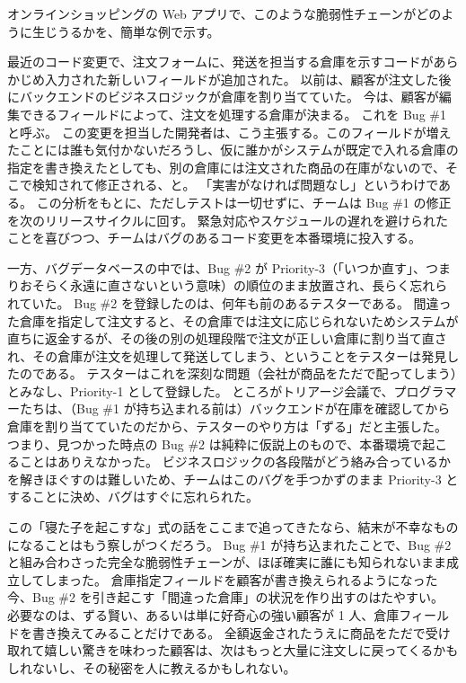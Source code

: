 \documentclass[uplatex]{jsarticle}
\def\label#1{}%
\begin{document}
\begin{exa}[オンラインショッピングにおける脆弱性チェーン]\label{exa:ch8-warehouse-chain}
オンラインショッピングの Web アプリで、このような脆弱性チェーンがどのように生じうるかを、簡単な例で示す。

最近のコード変更で、注文フォームに、発送を担当する倉庫を示すコードがあらかじめ入力された新しいフィールドが追加された。
以前は、顧客が注文した後にバックエンドのビジネスロジックが倉庫を割り当てていた。
今は、顧客が編集できるフィールドによって、注文を処理する倉庫が決まる。
これを Bug \#1 と呼ぶ。
この変更を担当した開発者は、こう主張する。このフィールドが増えたことには誰も気付かないだろうし、仮に誰かがシステムが既定で入れる倉庫の指定を書き換えたとしても、別の倉庫には注文された商品の在庫がないので、そこで検知されて修正される、と。
「実害がなければ問題なし」というわけである。
この分析をもとに、ただしテストは一切せずに、チームは Bug \#1 の修正を次のリリースサイクルに回す。
緊急対応やスケジュールの遅れを避けられたことを喜びつつ、チームはバグのあるコード変更を本番環境に投入する。

一方、バグデータベースの中では、Bug \#2 が Priority-3（「いつか直す」、つまりおそらく永遠に直さないという意味）の順位のまま放置され、長らく忘れられていた。
Bug \#2 を登録したのは、何年も前のあるテスターである。
間違った倉庫を指定して注文すると、その倉庫では注文に応じられないためシステムが直ちに返金するが、その後の別の処理段階で注文が正しい倉庫に割り当て直され、その倉庫が注文を処理して発送してしまう、ということをテスターは発見したのである。
テスターはこれを深刻な問題（会社が商品をただで配ってしまう）とみなし、Priority-1 として登録した。
ところがトリアージ会議で、プログラマーたちは、（Bug \#1 が持ち込まれる前は）バックエンドが在庫を確認してから倉庫を割り当てていたのだから、テスターのやり方は「ずる」だと主張した。
つまり、見つかった時点の Bug \#2 は純粋に仮説上のもので、本番環境で起こることはありえなかった。
ビジネスロジックの各段階がどう絡み合っているかを解きほぐすのは難しいため、チームはこのバグを手つかずのまま Priority-3 とすることに決め、バグはすぐに忘れられた。

この「寝た子を起こすな」式の話をここまで追ってきたなら、結末が不幸なものになることはもう察しがつくだろう。
Bug \#1 が持ち込まれたことで、Bug \#2 と組み合わさった完全な脆弱性チェーンが、ほぼ確実に誰にも知られないまま成立してしまった。
倉庫指定フィールドを顧客が書き換えられるようになった今、Bug \#2 を引き起こす「間違った倉庫」の状況を作り出すのはたやすい。
必要なのは、ずる賢い、あるいは単に好奇心の強い顧客が 1 人、倉庫フィールドを書き換えてみることだけである。
全額返金されたうえに商品をただで受け取れて嬉しい驚きを味わった顧客は、次はもっと大量に注文しに戻ってくるかもしれないし、その秘密を人に教えるかもしれない。
\end{exa}
\end{document}
